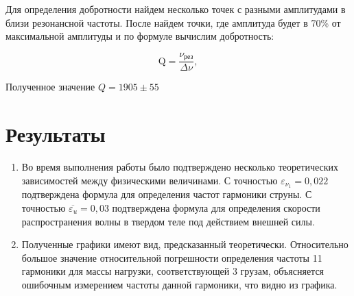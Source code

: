 \documentclass[12pt,a4paper]{article}
\begin{document}
\newpage
Для определения добротности найдем несколько точек с разными амплитудами в близи резонансной частоты.
После найдем точки, где амплитуда будет в 70\% от максимальной амплитуды и по формуле вычислим добротность:

\begin{equation}
	\text{Q} = \frac{\nu_{\text{рез}}}{\Delta\nu},
	\label{eq:frequency_velocity_equation}
\end{equation}

Полученное значение $Q = 1905 \pm 55$
\section{Результаты}

\begin{enumerate}
	\item Во время выполнения работы было подтверждено несколько теоретических зависимостей между физическими величинами. С точностью $\varepsilon_{\nu_{1}} = 0,022$ подтверждена формула для определения частот гармоники струны. С точностью  $\overline{\varepsilon_{u}} = 0,03$ подтверждена формула для определения скорости распространения волны в твердом теле под действием внешней силы.
	\item Полученные графики имеют вид, предсказанный теоретически. Относительно большое значение относительной погрешности определения частоты 11 гармоники для массы нагрузки, соответствующей 3 грузам, объясняется ошибочным измерением частоты данной гармоники, что видно из графика. 
	
	

\end{enumerate}
\end{document}
